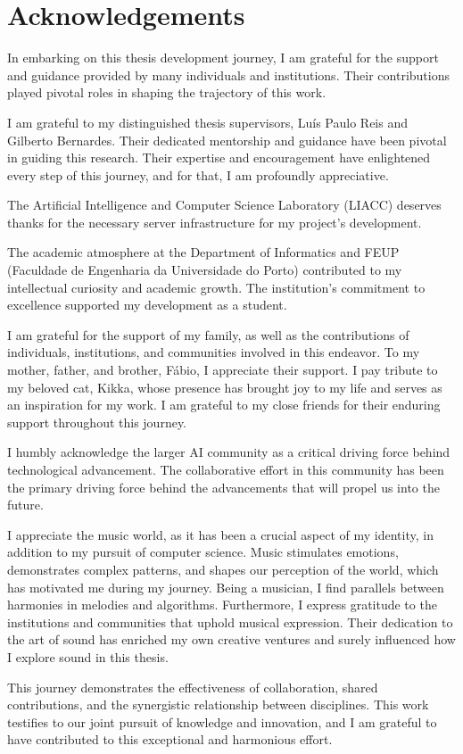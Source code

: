 \chapter*{Acknowledgements}

In embarking on this thesis development journey, I am grateful for the support and guidance provided by many individuals and institutions. Their contributions played pivotal roles in shaping the trajectory of this work.

I am grateful to my distinguished thesis supervisors, Luís Paulo Reis and Gilberto Bernardes. Their dedicated mentorship and guidance have been pivotal in guiding this research. Their expertise and encouragement have enlightened every step of this journey, and for that, I am profoundly appreciative.

The Artificial Intelligence and Computer Science Laboratory (LIACC) deserves thanks for the necessary server infrastructure for my project's development. 

The academic atmosphere at the Department of Informatics and FEUP (Faculdade de Engenharia da Universidade do Porto) contributed to my intellectual curiosity and academic growth. The institution's commitment to excellence supported my development as a student.

I am grateful for the support of my family, as well as the contributions of individuals, institutions, and communities involved in this endeavor. To my mother, father, and brother, Fábio, I appreciate their support. I pay tribute to my beloved cat, Kikka, whose presence has brought joy to my life and serves as an inspiration for my work. I am grateful to my close friends for their enduring support throughout this journey.

I humbly acknowledge the larger AI community as a critical driving force behind technological advancement. The collaborative effort in this community has been the primary driving force behind the advancements that will propel us into the future.

I appreciate the music world, as it has been a crucial aspect of my identity, in addition to my pursuit of computer science. Music stimulates emotions, demonstrates complex patterns, and shapes our perception of the world, which has motivated me during my journey. Being a musician, I find parallels between harmonies in melodies and algorithms. Furthermore, I express gratitude to the institutions and communities that uphold musical expression. Their dedication to the art of sound has enriched my own creative ventures and surely influenced how I explore sound in this thesis.

This journey demonstrates the effectiveness of collaboration, shared contributions, and the synergistic relationship between disciplines. This work testifies to our joint pursuit of knowledge and innovation, and I am grateful to have contributed to this exceptional and harmonious effort.

\vspace{10mm}
